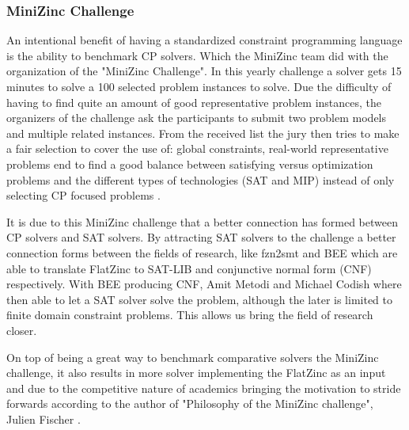 \subsubsection{MiniZinc Challenge}
An intentional benefit of having a standardized constraint programming language is the ability to benchmark CP solvers. Which the MiniZinc team did with the organization of the "MiniZinc Challenge". In this yearly challenge a solver gets  15 minutes to solve a 100 selected problem instances to solve. Due the difficulty of having to find quite an amount of good representative problem instances, the organizers of the challenge ask the participants to submit two problem models and multiple related instances. From the received list the jury then tries to make a fair selection to cover the use of: global constraints, real-world representative problems end to find a good balance between satisfying versus optimization problems and the different types of technologies (SAT and MIP) instead of only selecting CP focused problems \cite{58stuckey2014minizinc}.

It is due to this MiniZinc challenge that a better connection has formed between CP solvers and SAT solvers. By attracting SAT solvers to the challenge a better connection forms between the fields of research, like fzn2smt \cite{72bofill2010system} and BEE \cite{69BEEmetodi2012compiling} which are able to translate FlatZinc to SAT-LIB and conjunctive normal form (CNF) respectively. With BEE producing CNF, Amit Metodi and Michael Codish where then able to let a SAT solver solve the problem, although the later is limited to finite domain constraint problems. This allows us bring the field of research closer.

On top of being a great way to benchmark comparative solvers the MiniZinc challenge, it also results in more solver implementing the FlatZinc as an input and due to the competitive nature of academics bringing the motivation to stride forwards according to the author of "Philosophy of the MiniZinc challenge", Julien Fischer \cite{59stuckey2010philosophy}.

